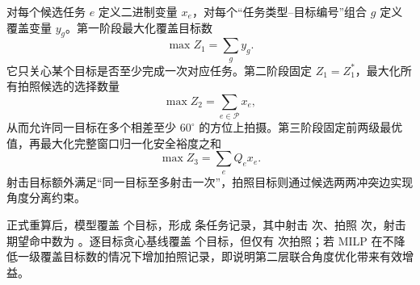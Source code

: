 对每个候选任务 $e$ 定义二进制变量 $x_e$，对每个“任务类型--目标编号”组合 $g$ 定义覆盖变量 $y_g$。第一阶段最大化覆盖目标数
\[
\max Z_1=\sum_g y_g.
\]
它只关心某个目标是否至少完成一次对应任务。第二阶段固定 $Z_1=Z_1^*$，最大化所有拍照候选的选择数量
\[
\max Z_2=\sum_{e\in\mathcal P}x_e,
\]
从而允许同一目标在多个相差至少 $60^\circ$ 的方位上拍摄。第三阶段固定前两级最优值，再最大化完整窗口归一化安全裕度之和
\[
\max Z_3=\sum_e Q_e x_e.
\]
射击目标额外满足“同一目标至多射击一次”，拍照目标则通过候选两两冲突边实现角度分离约束。

正式重算后，模型覆盖 \QFourCoverageCount 个目标，形成 \QFourTaskCount 条任务记录，其中射击 \QFourShootCount 次、拍照 \QFourPhotoCount 次，射击期望命中数为 \QFourExpectedHits。逐目标贪心基线覆盖 \QFourGreedyCoverage 个目标，但仅有 \QFourGreedyPhotoCount 次拍照；若 MILP 在不降低一级覆盖目标数的情况下增加拍照记录，即说明第二层联合角度优化带来有效增益。




